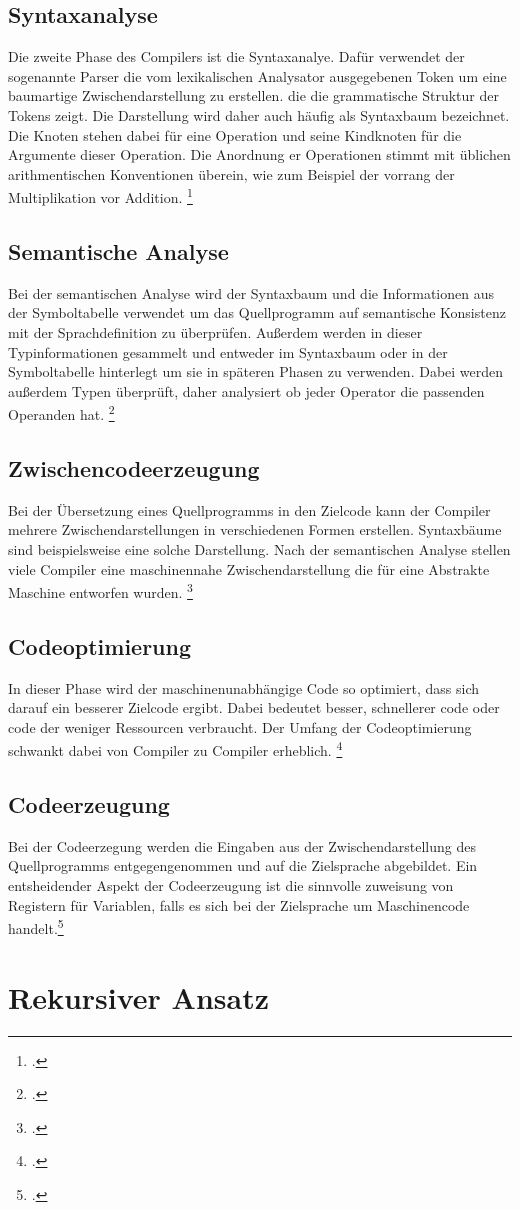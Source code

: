 \subsection{Syntaxanalyse}
Die zweite Phase des Compilers ist die Syntaxanalye. Dafür verwendet der sogenannte Parser die vom lexikalischen Analysator ausgegebenen Token um eine baumartige Zwischendarstellung zu erstellen. die die grammatische Struktur der Tokens zeigt. Die Darstellung wird daher auch häufig als Syntaxbaum bezeichnet. Die Knoten stehen dabei für eine Operation und seine Kindknoten für die Argumente dieser Operation. Die Anordnung er Operationen stimmt mit üblichen arithmentischen Konventionen überein, wie zum Beispiel der vorrang der Multiplikation vor Addition. \footcite[Vgl.][S. 9]{Ullmann2008}
\subsection{Semantische Analyse}
Bei der semantischen Analyse wird der Syntaxbaum und die Informationen aus der Symboltabelle verwendet um das Quellprogramm auf semantische Konsistenz mit der Sprachdefinition zu überprüfen. Außerdem werden in dieser Typinformationen gesammelt und entweder im Syntaxbaum oder in der Symboltabelle hinterlegt um sie in späteren Phasen zu verwenden. Dabei werden außerdem Typen überprüft, daher analysiert ob jeder Operator die passenden Operanden hat. \footcite[Vgl.][S. 9ff]{Ullmann2008}
\subsection{Zwischencodeerzeugung}
Bei der Übersetzung eines Quellprogramms in den Zielcode kann der Compiler mehrere Zwischendarstellungen in verschiedenen Formen erstellen. Syntaxbäume sind beispielsweise eine solche Darstellung. Nach der semantischen Analyse stellen viele Compiler eine maschinennahe Zwischendarstellung die für eine Abstrakte Maschine entworfen wurden.  \footcite[Vgl.][S. 11]{Ullmann2008}
\subsection{Codeoptimierung}
In dieser Phase wird der maschinenunabhängige Code so optimiert, dass sich darauf ein besserer Zielcode ergibt. Dabei bedeutet besser, schnellerer code oder code der weniger Ressourcen verbraucht. Der Umfang der Codeoptimierung schwankt dabei von Compiler zu Compiler erheblich.  \footcite[Vgl.][S. 11f]{Ullmann2008}
\subsection{Codeerzeugung}
Bei der Codeerzegung werden die Eingaben aus der Zwischendarstellung des Quellprogramms entgegengenommen und auf die Zielsprache abgebildet. Ein entsheidender Aspekt der Codeerzeugung ist die sinnvolle zuweisung von Registern für Variablen, falls es sich bei der Zielsprache um Maschinencode handelt.\footcite[Vgl.][S. 13]{Ullmann2008}

\section{Rekursiver Ansatz}